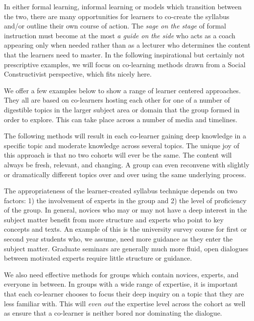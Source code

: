 
In either formal learning, informal learning or models which transition
between the two, there are many opportunities for learners to co-create
the syllabus and/or outline their own course of action. The \emph{sage
on the stage} of formal instruction must become at the most \emph{a
guide on the side} who acts as a coach appearing only when needed rather
than as a lecturer who determines the content that the learners need to
master. In the following inspirational but certainly not prescriptive
examples, we will focus on co-learning methods drawn from a Social
Constructivist perspective, which fits nicely here.

We offer a few examples below to show a range of learner centered
approaches. They all are based on co-learners hosting each other for one
of a number of digestible topics in the larger subject area or domain
that the group formed in order to explore. This can take place across a
number of media and timelines.

The following methods will result in each co-learner gaining deep
knowledge in a specific topic and moderate knowledge across several
topics. The unique joy of this approach is that no two cohorts will ever
be the same. The content will always be fresh, relevant, and changing. A
group can even reconvene with slightly or dramatically different topics
over and over using the same underlying process.

The appropriateness of the learner-created syllabus technique depends on
two factors: 1) the involvement of experts in the group and 2) the level
of proficiency of the group. In general, novices who may or may not have
a deep interest in the subject matter benefit from more structure and
experts who point to key concepts and texts. An example of this is the
university survey course for first or second year students who, we
assume, need more guidance as they enter the subject matter. Graduate
seminars are generally much more fluid, open dialogues between motivated
experts require little structure or guidance.

We also need effective methods for groups which contain novices,
experts, and everyone in between. In groups with a wide range of
expertise, it is important that each co-learner chooses to focus their
deep inquiry on a topic that they are less familiar with. This will
\emph{even out} the expertise level across the cohort as well as ensure
that a co-learner is neither bored nor dominating the dialogue.

